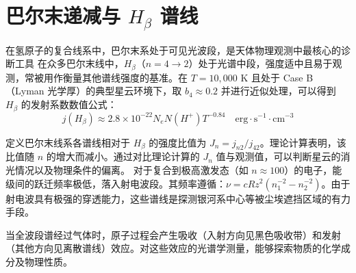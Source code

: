 \section{巴尔末递减与 $H_\beta$ 谱线}

在氢原子的复合线系中，巴尔末系处于可见光波段，是天体物理观测中最核心的诊断工具
在众多巴尔末线中，$H_\beta$（$n=4 \to 2$）处于光谱中段，强度适中且易于观测，常被用作衡量其他谱线强度的基准。在 $T=10,000\text{ K}$ 且处于 Case B（Lyman 光学厚）的典型星云环境下，取 $b_4 \approx 0.2$ 并进行近似处理，可以得到 $H_\beta$ 的发射系数数值公式：
\begin{equation}
    j(H_\beta) \approx 2.8 \times 10^{-22} N_e N(H^+) T^{-0.84} \quad \text{erg} \cdot \text{s}^{-1} \cdot \text{cm}^{-3}
\end{equation}

定义巴尔末线系各谱线相对于 $H_\beta$ 的强度比值为 $J_n = j_{n2}/j_{42}$。理论计算表明，该比值随 $n$ 的增大而减小。通过对比理论计算的 $J_n$ 值与观测值，可以判断星云的消光情况以及物理条件的偏离。
对于复合到极高激发态（如 $n \approx 100$）的电子，能级间的跃迁频率极低，落入射电波段。其频率遵循：$\nu = cR z^2 (n_1^{-2} - n_2^{-2})$。由于射电波具有极强的穿透能力，这些谱线是探测银河系中心等被尘埃遮挡区域的有力手段。

当全波段谱经过气体时，原子过程会产生吸收（入射方向见黑色吸收带）和发射（其他方向见离散谱线）效应。对这些效应的光谱学测量，能够探索物质的化学成分及物理性质。